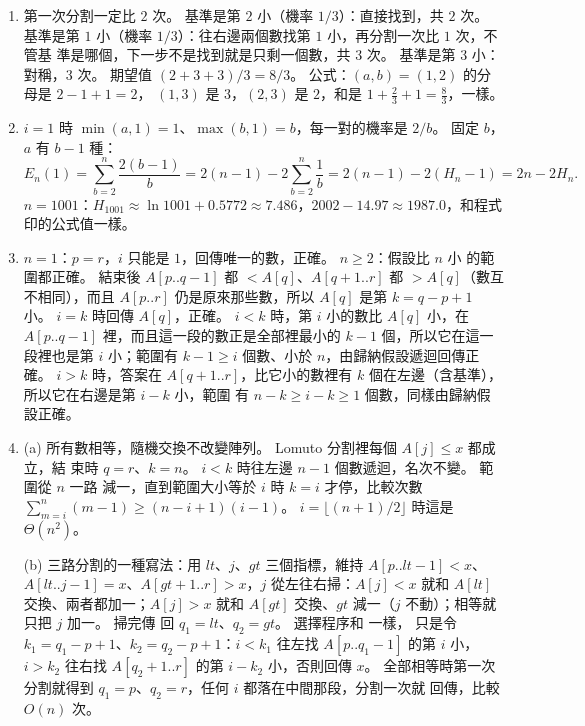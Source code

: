 \begin{enumerate}
\item 第一次分割一定比 $2$ 次。 基準是第 $2$ 小（機率 $1/3$）：直接找到，共 $2$ 次。
基準是第 $1$ 小（機率 $1/3$）：往右邊兩個數找第 $1$ 小，再分割一次比 $1$ 次，不管基
準是哪個，下一步不是找到就是只剩一個數，共 $3$ 次。 基準是第 $3$ 小：對稱，$3$ 次。
期望值 $(2 + 3 + 3)/3 = 8/3$。 公式：$(a, b) = (1, 2)$ 的分母是 $2 - 1 + 1 = 2$，
$(1, 3)$ 是 $3$，$(2, 3)$ 是 $2$，和是 $1 + \frac{2}{3} + 1 = \frac{8}{3}$，一樣。

\item $i = 1$ 時 $\min(a, 1) = 1$、$\max(b, 1) = b$，每一對的機率是 $2/b$。 固定 $b$，
$a$ 有 $b - 1$ 種：
\[
E_n(1) = \sum_{b=2}^{n} \frac{2(b-1)}{b} = 2(n - 1) - 2\sum_{b=2}^{n} \frac{1}{b}
= 2(n - 1) - 2(H_n - 1) = 2n - 2H_n.
\]
$n = 1001$：$H_{1001} \approx \ln 1001 + 0.5772 \approx 7.486$，$2002 - 14.97 \approx
1987.0$，和程式印的公式值一樣。

\item $n = 1$：$p = r$，$i$ 只能是 $1$，回傳唯一的數，正確。 $n \ge 2$：假設比 $n$ 小
的範圍都正確。  結束後 $A[p..q-1]$ 都 $< A[q]$、$A[q+1..r]$ 都
$> A[q]$（數互不相同），而且 $A[p..r]$ 仍是原來那些數，所以 $A[q]$ 是第 $k = q - p + 1$
小。 $i = k$ 時回傳 $A[q]$，正確。 $i < k$ 時，第 $i$ 小的數比 $A[q]$ 小，在
$A[p..q-1]$ 裡，而且這一段的數正是全部裡最小的 $k - 1$ 個，所以它在這一段裡也是第 $i$
小；範圍有 $k - 1 \ge i$ 個數、小於 $n$，由歸納假設遞迴回傳正確。 $i > k$ 時，答案在
$A[q+1..r]$，比它小的數裡有 $k$ 個在左邊（含基準），所以它在右邊是第 $i - k$ 小，範圍
有 $n - k \ge i - k \ge 1$ 個數，同樣由歸納假設正確。

\item (a) 所有數相等，隨機交換不改變陣列。 Lomuto 分割裡每個 $A[j] \le x$ 都成立，結
束時 $q = r$、$k = n$。 $i < k$ 時往左邊 $n - 1$ 個數遞迴，名次不變。 範圍從 $n$ 一路
減一，直到範圍大小等於 $i$ 時 $k = i$ 才停，比較次數
$\sum_{m=i}^{n} (m - 1) \ge (n - i + 1)(i - 1)$。 $i = \lfloor (n+1)/2 \rfloor$ 時這是
$\Theta(n^2)$。

(b) 三路分割的一種寫法：用 $\mathit{lt}$、$j$、$\mathit{gt}$ 三個指標，維持
$A[p..\mathit{lt}-1] < x$、$A[\mathit{lt}..j-1] = x$、$A[\mathit{gt}+1..r] > x$，$j$
從左往右掃：$A[j] < x$ 就和 $A[\mathit{lt}]$ 交換、兩者都加一；$A[j] > x$ 就和
$A[\mathit{gt}]$ 交換、$\mathit{gt}$ 減一（$j$ 不動）；相等就只把 $j$ 加一。 掃完傳
回 $q_1 = \mathit{lt}$、$q_2 = \mathit{gt}$。 選擇程序和  一樣，
只是令 $k_1 = q_1 - p + 1$、$k_2 = q_2 - p + 1$：$i < k_1$ 往左找 $A[p..q_1 - 1]$ 的第
$i$ 小，$i > k_2$ 往右找 $A[q_2 + 1..r]$ 的第 $i - k_2$ 小，否則回傳 $x$。
全部相等時第一次分割就得到 $q_1 = p$、$q_2 = r$，任何 $i$ 都落在中間那段，分割一次就
回傳，比較 $O(n)$ 次。


\end{enumerate}
